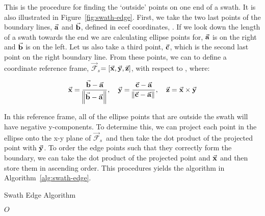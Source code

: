 
\newcommand{\Fs}{$\vec{\mathcal{F}}_s$} 

This is the procedure for finding the `outside' points on one end of a swath.
It is also illustrated in Figure~\ref{fig:swath-edge}. First, we take the two
last points of the boundary lines, $\vec{\bm{\mathrm{a}}}$ and $\vec{\bm{\mathrm{b}}}$, defined in
\gls{ecef} coordinates, \Fe. If we look down the length of a swath towards the
end we are calculating ellipse points for, $\vec{\bm{\mathrm{a}}}$ is on the right and
$\vec{\bm{\mathrm{b}}}$ is on the left.  Let us also take a third point, $\vec{\bm{\mathrm{c}}}$, which is
the second last point on the right boundary line.  From these points, we can to
define a coordinate reference frame, \Fs $= [\vec{\bm{\mathrm{x}}}, \vec{\bm{\mathrm{y}}}, \vec{\bm{\mathrm{z}}}]$, with
respect to \Fe, where:

\begin{equation}
    \vec{\bm{\mathrm{x}}} = \frac{\vec{\bm{\mathrm{b}}}-\vec{\bm{\mathrm{a}}}}{\norm{\vec{\bm{\mathrm{b}}} - \vec{\bm{\mathrm{a}}}}}
    , \quad
    \vec{\bm{\mathrm{y}}} = \frac{\vec{\bm{\mathrm{c}}}-\vec{\bm{\mathrm{a}}}}{\norm{\vec{\bm{\mathrm{c}}} - \vec{\bm{\mathrm{a}}}}}
    , \quad
    \vec{\bm{\mathrm{z}}} = \vec{\bm{\mathrm{x}}} \times \vec{\bm{\mathrm{y}}}
\end{equation}

In this reference frame, all of the ellipse points that are outside the swath
will have negative y-components. To determine this, we can project each point
in the ellipse onto the x-y plane of \Fs~and then take the dot product of the
projected point with $\vec{\bm{\mathrm{y}}}$. To order the edge points such that they
correctly form the boundary, we can take the dot product of the projected point
and $\vec{\bm{\mathrm{x}}}$ and then store them in ascending order. This procedures yields
the algorithm in Algorithm~\ref{alg:swath-edge}.


\begin{algorithm}
    \caption{Swath Edge Algorithm} 
    \label{alg:swath-edge}
    \begin{algorithmic}[1] 
		
		
		


	    \EndIf
	\EndFor
	\State \Return $O$
	\EndFunction
    \end{algorithmic} 
\end{algorithm}

